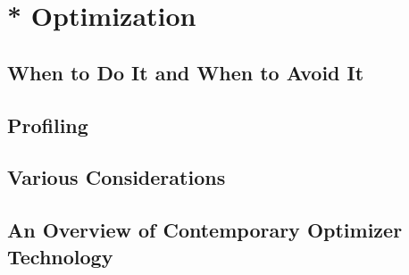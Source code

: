 \section{* Optimization}
\subsection{When to Do It and When to Avoid It}
\subsection{Profiling}
\subsection{Various Considerations}
\subsection{An Overview of Contemporary Optimizer Technology}



